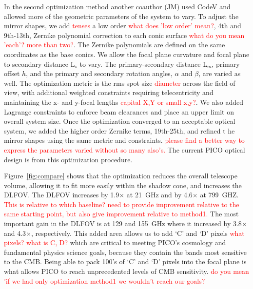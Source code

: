 \documentclass[]{spie}  %
\newcommand{\comr}[1]{\textcolor{red}{#1}}
\begin{document}
In the second optimization method another coauthor (JM) used CodeV and allowed more of the geometric 
parameters of the system to vary.  To adjust the 
mirror shapes, we add \comr{tenses} a low order \comr{what does 'low order' mean?}, 4th and 9th-13th, 
Zernike polynomial correction to each conic surface \comr{what do you mean 'each'? more than two?}. 
The Zernike polynomials are defined on the same coordinates as the base conics.  We allow the focal plane curvature 
and focal plane to secondary distance L$_s$ to vary.  The primary-secondary distance L$_m$, primary offset $h$, 
and the primary and secondary rotation angles, $\alpha$ and $\beta$, are varied as well.  The optimization 
metric is the rms spot size \comr{diameter} across the field of view, with additional weighted constraints requiring telecentricity and 
maintaining the x- and y-focal lengths \comr{capital X,Y or small x,y?}.  We also added Lagrange constraints 
to enforce beam clearances and place an upper limit on overall system size.  Once the optimization converged to 
an acceptable optical system, we added the higher order Zernike terms, 19th-25th, and refined t
he mirror shapes using the same metric and constraints. \comr{please find a better way 
to express the parameters varied without so many also's.}
The current PICO optical design is from this optimization procedure.


Figure~\ref{fig:compare} 
shows that the optimization reduces the overall telescope volume, allowing it to fit more easily within the shadow cone, 
and increases the DLFOV.  
The DLFOV increases by 1.9$\times$ at 21~GHz and by 4.6$\times$ at 799~GHZ. \comr{This is relative to which 
baseline? need to provide improvement relative to the same starting point, but also give improvement relative 
to method1.}
The most important gain in the DLFOV is at 129 and 155~GHz where it increased by 3.8$\times$ and 4.3$\times$, respectively.  
This added area allows us to add `C' and `D' pixels \comr{what pixels? what is C, D?} which are critical to meeting PICO's 
cosmology and fundamental physics science goals, because they contain the bands most sensitive to the CMB. Being able to 
pack 100's of `C' and `D' pixels into the focal plane is what allows PICO to reach unprecedented levels of CMB sensitivity. \comr{do 
you mean 'if we had only optimization method1 we wouldn't reach our goals?}
\end{document}
